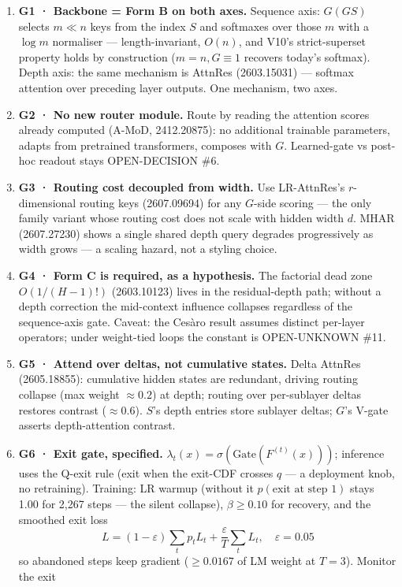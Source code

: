 \begin{enumerate}
\item \textbf{G1 · Backbone = Form B on both axes.} Sequence axis: $G(GS)$ selects
$m \ll n$ keys from the index $S$ and softmaxes over those $m$ with a $\log m$ normaliser ---
length-invariant, $O(n)$, and V10's strict-superset property holds by construction
($m = n, G \equiv 1$ recovers today's softmax). Depth axis: the same mechanism is AttnRes
(2603.15031) --- softmax attention over preceding layer outputs. One mechanism, two axes.
\item \textbf{G2 · No new router module.} Route by reading the attention scores already
computed (A-MoD, 2412.20875): no additional trainable parameters, adapts from pretrained
transformers, composes with $G$. Learned-gate vs post-hoc readout stays OPEN-DECISION \#6.
\item \textbf{G3 · Routing cost decoupled from width.} Use LR-AttnRes's $r$-dimensional routing
keys (2607.09694) for any $G$-side scoring --- the only family variant whose routing cost does
not scale with hidden width $d$. MHAR (2607.27230) shows a single shared depth query degrades
progressively as width grows --- a scaling hazard, not a styling choice.
\item \textbf{G4 · Form C is required, as a hypothesis.} The factorial dead zone
$O(1/(H{-}1)!)$ (2603.10123) lives in the residual-depth path; without a depth correction the
mid-context influence collapses regardless of the sequence-axis gate. Caveat: the Ces\`aro
result assumes distinct per-layer operators; under weight-tied loops the constant is
OPEN-UNKNOWN \#11.
\item \textbf{G5 · Attend over deltas, not cumulative states.} Delta AttnRes (2605.18855):
cumulative hidden states are redundant, driving routing collapse (max weight $\approx 0.2$) at
depth; routing over per-sublayer deltas restores contrast ($\approx 0.6$). $S$'s depth entries
store sublayer deltas; $G$'s V-gate asserts depth-attention contrast.
\item \textbf{G6 · Exit gate, specified.} $\lambda_t(x) = \sigma(\mathrm{Gate}(F^{(t)}(x)))$;
inference uses the Q-exit rule (exit when the exit-CDF crosses $q$ --- a deployment knob, no
retraining). Training: LR warmup (without it $p(\text{exit at step 1})$ stays 1.00 for 2{,}267
steps --- the silent collapse), $\beta \ge 0.10$ for recovery, and the smoothed exit loss
\[ L = (1-\varepsilon)\sum_t p_t L_t + \frac{\varepsilon}{T}\sum_t L_t, \quad \varepsilon = 0.05 \]
so abandoned steps keep gradient ($\ge 0.0167$ of LM weight at $T=3$). Monitor the exit

\end{enumerate}
